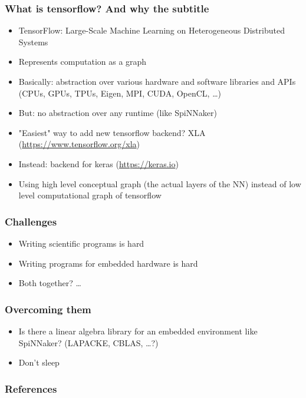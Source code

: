 \documentclass{beamer}
\begin{document}
\begin{frame}[fragile]
  \frametitle{What is tensorflow? And why the subtitle}
  \pause

  \begin{itemize}[<+->]
    \item TensorFlow: Large-Scale Machine Learning on
          Heterogeneous Distributed Systems \cite{tf_2015}
    \item Represents computation as a graph
    \item Basically: abstraction over various hardware and
          software libraries and APIs (CPUs, GPUs, TPUs,
          Eigen, MPI, CUDA, OpenCL, \dots)
    \item But: no abstraction over any runtime (like
          SpiNNaker)
    \item "Easiest" way to add new tensorflow backend? XLA
          (\url{https://www.tensorflow.org/xla})
    \item Instead: backend for keras (\url{https://keras.io})
    \item Using high level conceptual graph (the actual
          layers of the NN) instead of low level
          computational graph of tensorflow
  \end{itemize}
\end{frame}

\begin{frame}[fragile]
  \frametitle{Challenges}
  \pause

  \begin{itemize}[<+->]
    \item Writing scientific programs is hard
    \item Writing programs for embedded hardware is hard
    \item Both together? \dots
  \end{itemize}
\end{frame}

\begin{frame}[fragile]
  \frametitle{Overcoming them}
  \pause

  \begin{itemize}[<+->]
    \item Is there a linear algebra library for an embedded
          environment like SpiNNaker? (LAPACKE, CBLAS,
          \dots?)
    \item Don't sleep
  \end{itemize}
\end{frame}

\begin{frame}
  \frametitle{References}
  
\end{frame}
\end{document}

